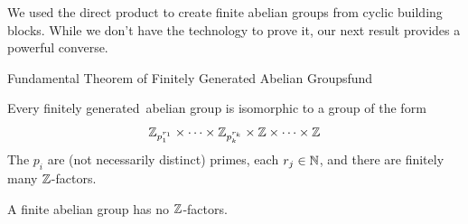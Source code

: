 
We used the direct product to create finite abelian groups from cyclic building blocks. While we don't have the technology to prove it, our next result provides a powerful converse.

\begin{thm}{Fundamental Theorem of Finitely Generated Abelian Groups}{fund}\par
	Every finitely generated\footnotemark\ abelian group is isomorphic to a group of the form
	\[
		\mathbb{Z}_{p_1^{r_1}}\times\cdots\times\mathbb{Z}_{p_k^{r_k}}\times\mathbb{Z}\times\cdots\times\mathbb{Z}
	\]
	The $p_i$ are (not necessarily distinct) primes, each $r_j\in\mathbb{N}$, and there are finitely many $\mathbb{Z}$-factors.\par
	A finite abelian group has no $\mathbb{Z}$-factors.
\end{thm}



\goodbreak


